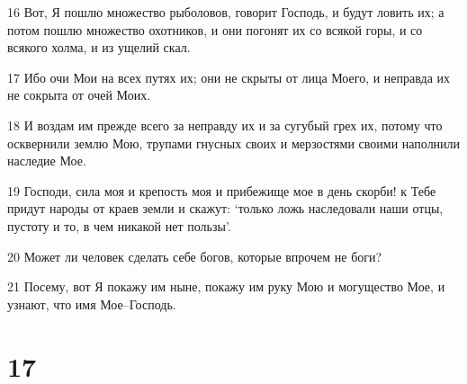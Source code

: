 \par 16 Вот, Я пошлю множество рыболовов, говорит Господь, и будут ловить их; а потом пошлю множество охотников, и они погонят их со всякой горы, и со всякого холма, и из ущелий скал.
\par 17 Ибо очи Мои на всех путях их; они не скрыты от лица Моего, и неправда их не сокрыта от очей Моих.
\par 18 И воздам им прежде всего за неправду их и за сугубый грех их, потому что осквернили землю Мою, трупами гнусных своих и мерзостями своими наполнили наследие Мое.
\par 19 Господи, сила моя и крепость моя и прибежище мое в день скорби! к Тебе придут народы от краев земли и скажут: `только ложь наследовали наши отцы, пустоту и то, в чем никакой нет пользы'.
\par 20 Может ли человек сделать себе богов, которые впрочем не боги?
\par 21 Посему, вот Я покажу им ныне, покажу им руку Мою и могущество Мое, и узнают, что имя Мое--Господь.

\chapter{17}

